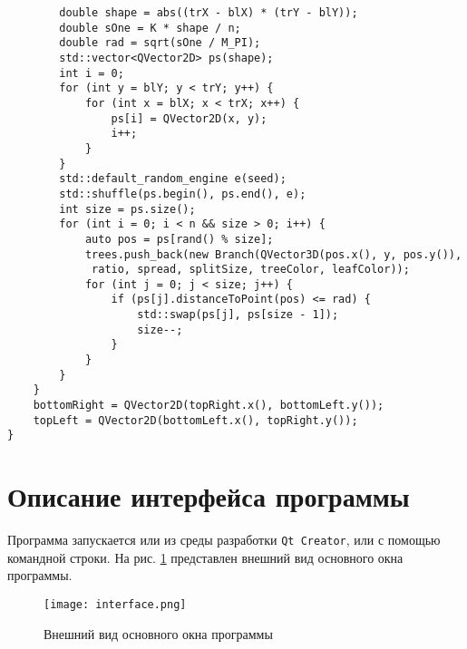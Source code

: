 \newpage
\begin{code}
\caption{Листинг функции, генерирующей случайное размещение деревьев (продолжение листинга \ref{lst:9})}
\label{lst:10}
\begin{verbatim}
        double shape = abs((trX - blX) * (trY - blY));
        double sOne = K * shape / n;
        double rad = sqrt(sOne / M_PI);
        std::vector<QVector2D> ps(shape);
        int i = 0;
        for (int y = blY; y < trY; y++) {
            for (int x = blX; x < trX; x++) {
                ps[i] = QVector2D(x, y);
                i++;
            }
        }
        std::default_random_engine e(seed);
        std::shuffle(ps.begin(), ps.end(), e);
        int size = ps.size();
        for (int i = 0; i < n && size > 0; i++) {
            auto pos = ps[rand() % size];
            trees.push_back(new Branch(QVector3D(pos.x(), y, pos.y()),
             ratio, spread, splitSize, treeColor, leafColor));
            for (int j = 0; j < size; j++) {
                if (ps[j].distanceToPoint(pos) <= rad) {
                    std::swap(ps[j], ps[size - 1]);
                    size--;
                }
            }
        }
    }
    bottomRight = QVector2D(topRight.x(), bottomLeft.y());
    topLeft = QVector2D(bottomLeft.x(), topRight.y());
}
\end{verbatim}
\end{code}

\section{Описание интерфейса программы}
Программа запускается или из среды разработки \texttt{Qt Creator}, или с помощью командной строки. На рис. \ref{img:interface} представлен внешний вид основного окна программы.

\noindent
\begin{figure}[h!]
	\centering
    \texttt{[image: interface.png]}
    \caption{Внешний вид основного окна программы}
    \label{img:interface}
\end{figure}

